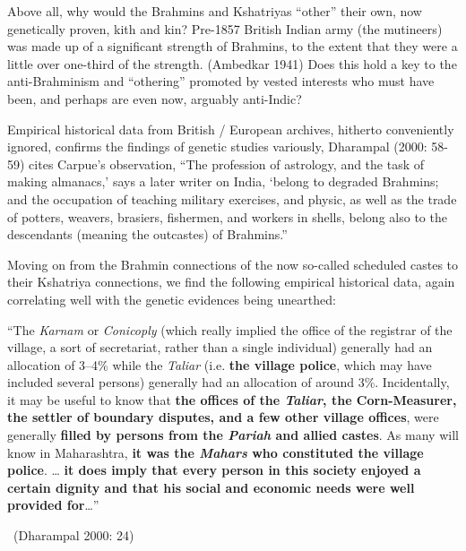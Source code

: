 \vspace{.1cm}

Above all, why would the Brahmins and Kshatriyas “other” their own, now genetically proven, kith and kin? Pre-1857 British Indian army (the mutineers) was made up of a significant strength of Brahmins, to the extent that they were a little over one-third of the strength. (Ambedkar 1941) Does this hold a key to the anti-Brahminism and “othering” promoted by vested interests who must have been, and perhaps are even now, arguably anti-Indic?

Empirical historical data from British / European archives, hitherto conveniently ignored, confirms the findings of genetic studies variously, Dharampal (2000: 58-59) cites Carpue’s observation, “The profession of astrology, and the task of making almanacs,’ says a later writer on India, ‘belong to degraded Brahmins; and the occupation of teaching military exercises, and physic, as well as the trade of potters, weavers, brasiers, fishermen, and workers in shells, belong also to the descendants (meaning the outcastes) of Brahmins.”

Moving on from the Brahmin connections of the now so-called scheduled castes to their Kshatriya connections, we find the following empirical historical data, again correlating well with the genetic evidences being unearthed:

\begin{myquote}
“The \textit{Karnam} or \textit{Conicoply} (which really implied the office of the registrar of the village, a sort of secretariat, rather than a single individual) generally had an allocation of 3–4\% while the \textit{Taliar} (i.e. \textbf{the village police}, which may have included several persons) generally had an allocation of around 3\%. Incidentally, it may be useful to know that \textbf{the offices of the \textit{Taliar}, the Corn-Measurer, the settler of boundary disputes, and a few other village offices}, were generally \textbf{filled by persons from the \textit{Pariah} and allied castes}. As many will know in Maharashtra, \textbf{it was the \textit{Mahars} who constituted the village police}. … \textbf{it does imply that every person in this society enjoyed a certain dignity and that his social and economic needs were well provided for}…” 

~\hfill (Dharampal 2000: 24)
\end{myquote}

